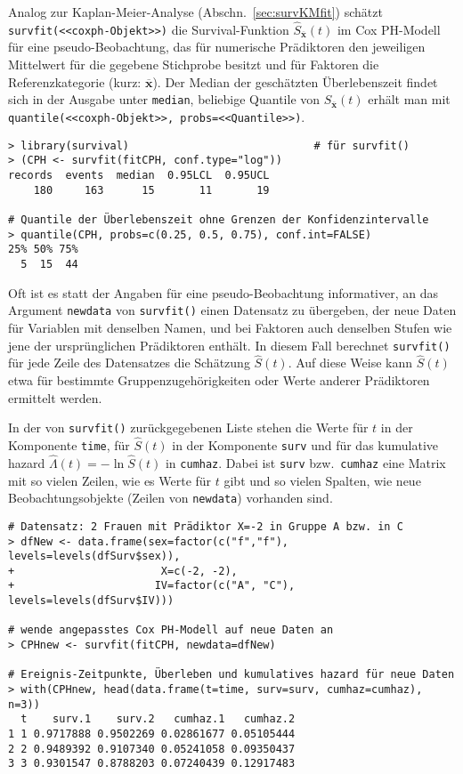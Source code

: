 Analog zur Kaplan-Meier-Analyse (Abschn.\ \ref{sec:survKMfit}) schätzt \lstinline!survfit(<<coxph-Objekt>>)! die Survival-Funktion $\hat{S}_{\overline{\bm{x}}}(t)$ im Cox PH-Modell für eine pseudo-Beobachtung, das für numerische Prädiktoren den jeweiligen Mittelwert für die gegebene Stichprobe besitzt und für Faktoren die Referenzkategorie (kurz: $\overline{\bm{x}}$). Der Median der geschätzten Überlebenszeit findet sich in der Ausgabe unter \lstinline!median!, beliebige Quantile von $\hat{S}_{\overline{\bm{x}}}(t)$ erhält man mit \lstinline!quantile(<<coxph-Objekt>>, probs=<<Quantile>>)!.
\begin{lstlisting}
> library(survival)                             # für survfit()
> (CPH <- survfit(fitCPH, conf.type="log"))
records  events  median  0.95LCL  0.95UCL
    180     163      15       11       19

# Quantile der Überlebenszeit ohne Grenzen der Konfidenzintervalle
> quantile(CPH, probs=c(0.25, 0.5, 0.75), conf.int=FALSE)
25% 50% 75%
  5  15  44
\end{lstlisting}

Oft ist es statt der Angaben für eine pseudo-Beobachtung informativer, an das Argument \lstinline!newdata! von \lstinline!survfit()! einen Datensatz zu übergeben, der neue Daten für Variablen mit denselben Namen, und bei Faktoren auch denselben Stufen wie jene der ursprünglichen Prädiktoren enthält. In diesem Fall berechnet \lstinline!survfit()! für jede Zeile des Datensatzes die Schätzung $\hat{S}(t)$. Auf diese Weise kann $\hat{S}(t)$ etwa für bestimmte Gruppenzugehörigkeiten oder Werte anderer Prädiktoren ermittelt werden.

In der von \lstinline!survfit()! zurückgegebenen Liste stehen die Werte für $t$ in der Komponente \lstinline!time!, für $\hat{S}(t)$ in der Komponente \lstinline!surv! und für das kumulative hazard $\hat{\Lambda}(t) = -\ln \hat{S}(t)$ in \lstinline!cumhaz!. Dabei ist \lstinline!surv! bzw.\ \lstinline!cumhaz! eine Matrix mit so vielen Zeilen, wie es Werte für $t$ gibt und so vielen Spalten, wie neue Beobachtungsobjekte (Zeilen von \lstinline!newdata!) vorhanden sind.
\begin{lstlisting}
# Datensatz: 2 Frauen mit Prädiktor X=-2 in Gruppe A bzw. in C
> dfNew <- data.frame(sex=factor(c("f","f"), levels=levels(dfSurv$sex)),
+                       X=c(-2, -2),
+                      IV=factor(c("A", "C"), levels=levels(dfSurv$IV)))

# wende angepasstes Cox PH-Modell auf neue Daten an
> CPHnew <- survfit(fitCPH, newdata=dfNew)

# Ereignis-Zeitpunkte, Überleben und kumulatives hazard für neue Daten
> with(CPHnew, head(data.frame(t=time, surv=surv, cumhaz=cumhaz), n=3))
  t    surv.1    surv.2   cumhaz.1   cumhaz.2
1 1 0.9717888 0.9502269 0.02861677 0.05105444
2 2 0.9489392 0.9107340 0.05241058 0.09350437
3 3 0.9301547 0.8788203 0.07240439 0.12917483
\end{lstlisting}

